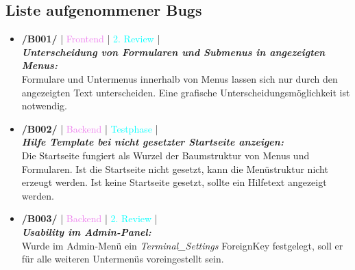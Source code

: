  \subsection{Liste aufgenommener Bugs}
\begin{itemize}
    \item \textbf{/B001/} | \textcolor{violet}{Frontend} | \textcolor{cyan}{2. Review} | \\ \noindent \textit{\textbf{Unterscheidung von Formularen und Submenus in angezeigten Menus:}} \\ \noindent Formulare und Untermenus innerhalb von Menus lassen sich nur durch den angezeigten Text unterscheiden. Eine grafische Unterscheidungsmöglichkeit ist notwendig.
    \item \textbf{/B002/} | \textcolor{violet}{Backend} | \textcolor{cyan}{Testphase} | \\ \noindent \textit{\textbf{Hilfe Template bei nicht gesetzter Startseite anzeigen:}} \\ \noindent Die Startseite fungiert als Wurzel der Baumstruktur von Menus und Formularen. Ist die Startseite nicht gesetzt, kann die Menüstruktur nicht erzeugt werden. Ist keine Startseite gesetzt, sollte ein Hilfetext angezeigt werden.
    \item \textbf{/B003/} | \textcolor{violet}{Backend} | \textcolor{cyan}{2. Review} | \\ \noindent \textit{\textbf{Usability im Admin-Panel:}} \\ \noindent Wurde im Admin-Menü ein \textit{Terminal\_Settings} ForeignKey festgelegt, soll er für alle weiteren Untermenüs voreingestellt sein.
\end{itemize}